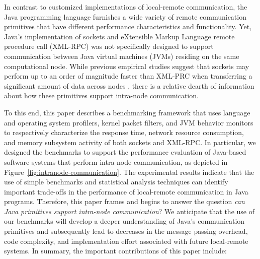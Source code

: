 \documentclass{sig-alternate}
\begin{document}


\begin{sloppypar}
In contrast to customized implementations of local-remote
communication, the Java programming language furnishes a wide variety
of remote communication primitives that have different performance
characteristics and functionality.  Yet, Java's implementation of
sockets and eXtensible Markup Language remote procedure call (XML-RPC)
was not specifically designed to support communication between Java
virtual machines (JVMs) residing on the same computational node.
While previous empirical studies suggest that sockets may perform up
to an order of magnitude faster than XML-PRC when transferring a
significant amount of data across nodes \cite{allman-per}, there is a
relative dearth of information about how these primitives support
intra-node communication.
\end{sloppypar}

\begin{sloppypar}
To this end, this paper describes a benchmarking framework that uses
language and operating system profilers, kernel packet filters, and
JVM behavior monitors to respectively characterize the response time,
network resource consumption, and memory subsystem activity of both
sockets and XML-RPC. In particular, we designed the benchmarks to
support the performance evaluation of Java-based software systems that
perform intra-node communication, as depicted in
Figure~\ref{fig:intranode-communication}.  The experimental results
indicate that the use of simple benchmarks and statistical analysis
techniques can identify important trade-offs in the performance of
local-remote communication in Java programs. Therefore, this paper
frames and begins to answer the question {\em can Java primitives
  support intra-node communication}?  We anticipate that the use of
our benchmarks will develop a deeper understanding of Java's
communication primitives and subsequently lead to decreases in the
message passing overhead, code complexity, and implementation effort
associated with future local-remote systems.  In summary, the
important contributions of this paper include: \vspace*{-.1in}
\end{sloppypar}
\end{document}
